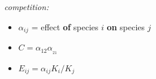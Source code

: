 \textsl{competition:}
\begin{itemize}
\item $\alpha_{ij}$ = effect \textbf{of} species $i$ \textbf{on} species $j$
\item $C = \alpha_{12}\alpha__{21}$
\item $E_{ij} = \alpha_{ij} K_i/K_j$
\end{itemize}
